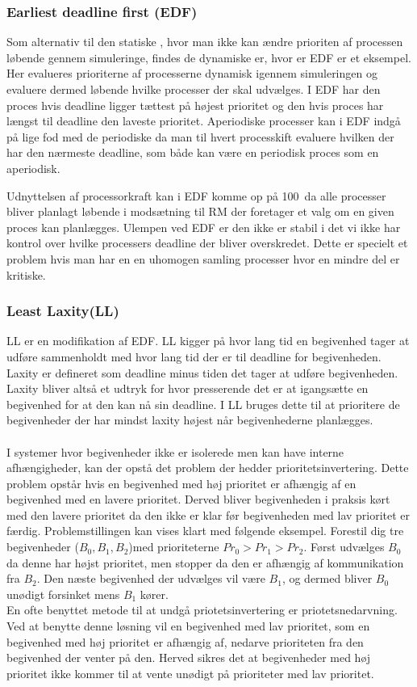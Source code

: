 \subsubsection{Earliest deadline first (EDF)}
Som alternativ til den statiske \sched, hvor man ikke kan ændre prioriten af processen løbende gennem simuleringe, findes de dynamiske \sched er, hvor er EDF er et eksempel. Her evalueres prioriterne af processerne dynamisk igennem simuleringen og evaluere dermed løbende hvilke processer der skal udvælges. I EDF har den proces hvis deadline ligger tættest på højest prioritet og den hvis proces har længst til deadline den laveste prioritet. Aperiodiske processer kan i EDF indgå på lige fod med de periodiske da man til hvert processkift evaluere hvilken der har den nærmeste deadline, som både kan være en periodisk proces som en aperiodisk.

Udnyttelsen af processorkraft kan i EDF komme op på 100\, da alle processer bliver planlagt løbende i modsætning til RM der foretager et valg om en given proces kan planlægges.  Ulempen ved EDF er den ikke er stabil i det vi ikke har kontrol over hvilke processers deadline der bliver overskredet. Dette er specielt et problem hvis man har en en uhomogen samling processer hvor en mindre del er kritiske.

\subsubsection{Least Laxity(LL)}
LL er en modifikation af EDF. LL kigger på hvor lang tid en begivenhed tager at udføre sammenholdt med hvor lang tid der er til deadline for begivenheden. Laxity er defineret som deadline minus tiden det tager at udføre begivenheden. Laxity bliver altså et udtryk for hvor presserende det er at igangsætte en begivenhed for at den kan nå sin deadline. I LL bruges dette til at prioritere de begivenheder der har mindst laxity højest når begivenhederne planlægges. \\
\\
I systemer hvor begivenheder ikke er isolerede men kan have interne afhængigheder, kan der opstå det problem der hedder prioritetsinvertering\cite{sha1990priority}. Dette problem opstår hvis en begivenhed med høj prioritet er afhængig af en begivenhed med en lavere prioritet. Derved bliver begivenheden i praksis kørt med den lavere prioritet da den ikke er klar før begivenheden med lav prioritet er færdig. Problemstillingen kan vises klart med følgende eksempel. Forestil dig tre begivenheder ($B_0,B_1,B_2$)med prioriteterne $Pr_0>Pr_1>Pr_2$. Først udvælges $B_0$ da denne har højst prioritet, men stopper da den er afhængig af kommunikation fra $B_2$. Den næste begivenhed der udvælges vil være $B_1$, og dermed bliver $B_0$ unødigt forsinket mens $B_1$ kører.\\
En ofte benyttet metode til at undgå priotetsinvertering er priotetsnedarvning. Ved at benytte denne løsning vil en begivenhed med lav prioritet, som en begivenhed med høj prioritet er afhængig af, nedarve prioriteten fra den begivenhed der venter på den. Herved sikres det at begivenheder med høj prioritet ikke kommer til at vente unødigt på prioriteter med lav prioritet. 

